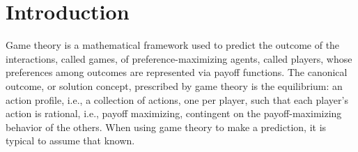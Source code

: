 \section{Introduction}


\amy{
\begin{itemize}
\item
\end{itemize}
}

Game theory is a mathematical framework used to predict the outcome of the interactions, called games, of preference-maximizing agents, called players, whose preferences among outcomes are represented via payoff functions.
The canonical outcome, or solution concept, prescribed by game theory is the equilibrium: an action profile, i.e., a collection of actions, one per player, such that each player's action is rational, i.e., payoff maximizing, contingent on the payoff-maximizing behavior of the others.
When using game theory to make a prediction, it is typical to assume that  known. 
